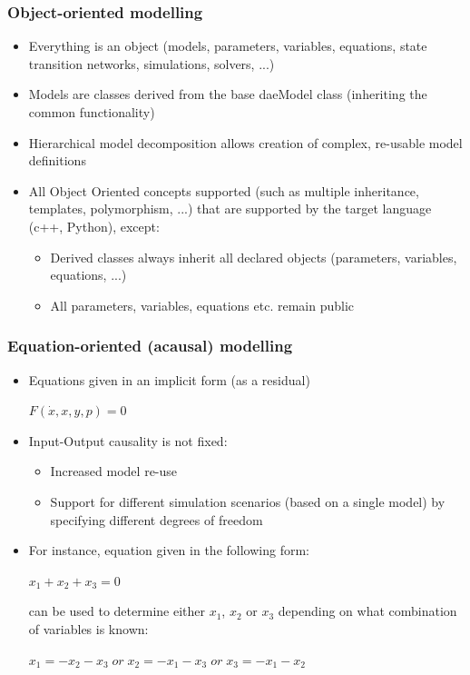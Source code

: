 \documentclass{beamer}
\begin{document}
\begin{frame}
\frametitle{Object-oriented modelling}
\begin{block}{}
\begin{itemize}
  \item Everything is an object (models, parameters, variables, equations, state transition networks, simulations, solvers, ...) 
  \item Models are classes derived from the base daeModel class (inheriting the common functionality)
  \item Hierarchical model decomposition allows creation of complex, re-usable model definitions
  \item All Object Oriented concepts supported (such as multiple inheritance, templates, polymorphism, ...) 
        that are supported by the target language (c++, Python), except:
  \begin{itemize}
      \item Derived classes always inherit all declared objects (parameters, variables, equations, ...)  
      \item All parameters, variables, equations etc. remain public
  \end{itemize}
\end{itemize}
\end{block}
\end{frame}

\begin{frame}
\frametitle{Equation-oriented (acausal) modelling}
\begin{block}{}
\begin{itemize}
  \item Equations given in an implicit form (as a residual)
    \begin{center}
      $F(\dot {x}, x, y, p) = 0$
    \end{center}
  \item Input-Output causality is not fixed:
  \begin{itemize}
    \item Increased model re-use
    \item Support for different simulation scenarios (based on a single model) by specifying different degrees of freedom
  \end{itemize}
  \item For instance, equation given in the following form:
    \begin{center}
      $x_1 + x_2 + x_3 = 0$
    \end{center}
    can be used to determine either $x_1$, $x_2$ or $x_3$ depending on what combination of variables is known:
    \begin{center}
      $x_1 = -x_2 - x_3 \; or \;  
      x_2 = -x_1 - x_3 \; or \; 
      x_3 = -x_1 - x_2$
    \end{center}
\end{itemize}
\end{block}
\end{frame}
\end{document}
